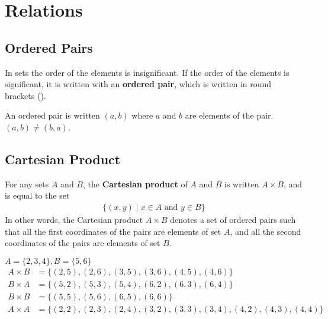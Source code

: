 \documentclass[../notes.tex]{subfiles}
\begin{document}
	\ifSubfilesClassLoaded{\setcounter{chapter}{4}}{}
	\chapter{Relations}
		\section{Ordered Pairs}
			In sets the order of the elements is insignificant. If the order of the elements is significant, it is written with an \textbf{ordered pair}, which is written in round brackets ().
			\begin{example}
				An ordered pair is written $(a, b)$ where $a$ and $b$ are elements of the pair. $(a, b) \neq (b, a)$.
			\end{example}
		\section{Cartesian Product}
			For any sets $A$ and $B$, the \textbf{Cartesian product} of $A$ and $B$ is written $A \times B$, and is equal to the set
			\begin{align*}
				\bigl\{(x, y) \mid x \in A \text{ and } y \in B\bigr\}
			\end{align*}
			In other words, the Cartesian product $A \times B$ denotes a set of ordered pairs such that all the first coordinates of the pairs are elements of set $A$, and all the second coordinates of the pairs are elements of set $B$.
			\begin{example}
				$A = \{2, 3, 4\}, B = \{5, 6\}$
				\begin{align*}
					A \times B &= \bigl\{(2, 5), (2, 6), (3, 5), (3, 6), (4, 5), (4, 6)\bigr\}\\
					B \times A &= \bigl\{(5, 2), (5, 3), (5, 4), (6, 2), (6, 3), (6, 4)\bigr\}\\
					B \times B &= \bigl\{(5, 5), (5, 6), (6, 5), (6, 6)\bigr\}\\
					A \times A &= \bigl\{(2, 2), (2, 3), (2, 4), (3, 2), (3, 3), (3, 4), (4, 2), (4, 3), (4, 4)\bigr\}
				\end{align*}
			\end{example}
		\pagebreak
\end{document}
